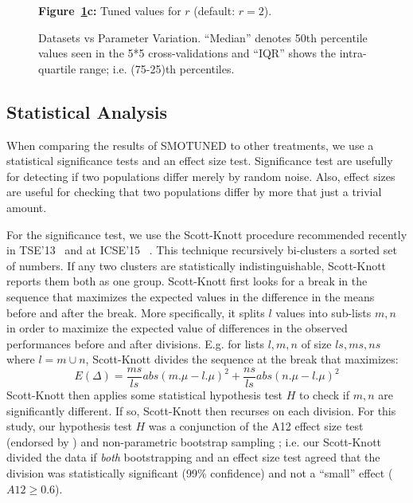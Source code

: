 \documentclass[10pt,conference]{IEEEtran}
\theoremstyle{break}
\theoremstyle{break}
\begin{document}
\begin{figure}[!t]
\begin{minipage}{.3\textwidth}
        {\bf Figure~\ref{fig:para}c:} Tuned values for $r$ (default:  $r=2$).
    \end{minipage}
    \caption{Datasets vs Parameter Variation.
    ``Median'' denotes 50th percentile values seen in the 5*5 cross-validations and ``IQR'' shows the intra-quartile
    range; i.e. (75-25)th percentiles.}
    \label{fig:para}
\vspace{-0.4cm}
\end{figure}

   
   
\subsection{Statistical Analysis}

When comparing the results of SMOTUNED to other
treatments, we use a statistical
significance tests and an effect size test.
Significance test are usefully for detecting if two populations
differ merely by random noise. 
Also, effect sizes are useful for checking that two populations differ by more that just a trivial amount.

For the significance test,  we use the 
     Scott-Knott procedure  recommended  recently in TSE'13~\cite{mittas13} and at ICSE'15~\cite{ghotra2015revisiting} . This
     technique recursively bi-clusters a sorted
    set of numbers. If any two clusters are statistically indistinguishable, Scott-Knott
    reports them both as one group.
    Scott-Knott first looks for a break in the sequence that maximizes the expected
    values in the difference in the means before and after the break.
    More specifically,  it  splits $l$ values into sub-lists $m,n$ in order to maximize the expected value of differences  in the observed performances before and after divisions. E.g. for lists $l,m,n$ of size $ls,ms,ns$ where $l=m\cup n$, Scott-Knott divides the sequence at the break that maximizes:
     \[E(\Delta)=\frac{ms}{ls}abs(m.\mu - l.\mu)^2 + \frac{ns}{ls}abs(n.\mu - l.\mu)^2\]
Scott-Knott then applies some statistical hypothesis test $H$ to check if $m,n$ are significantly different. If so, Scott-Knott then recurses on each division.
    For this study, our hypothesis test $H$ was a conjunction of the A12 effect size test (endorsed by
    \cite{arcuri11})  and non-parametric bootstrap sampling \cite{efron94}; i.e. our Scott-Knott divided the data if {\em both}
    bootstrapping and an effect size test agreed that the division was statistically significant (99\% confidence) and not a ``small'' effect ($A12 \ge 0.6$).
\end{document}
